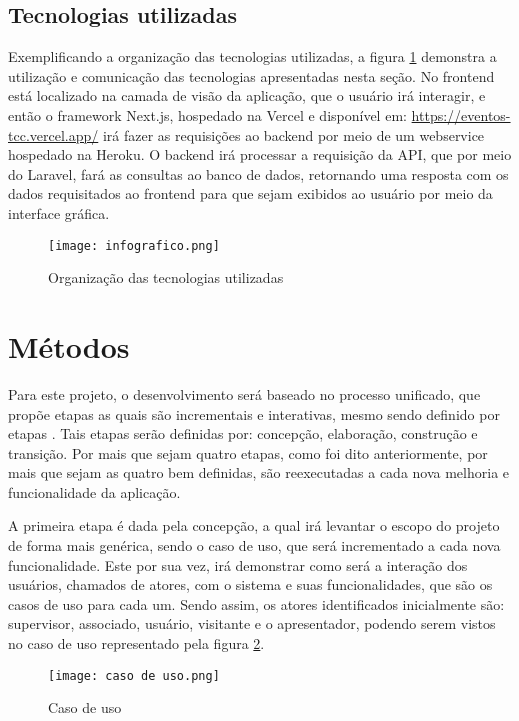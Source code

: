 \subsection{Tecnologias utilizadas}
Exemplificando a organização das tecnologias utilizadas, a figura \ref{info} demonstra a utilização e comunicação das tecnologias apresentadas nesta seção. No frontend está localizado na camada de visão da aplicação, que o usuário irá interagir, e então o framework Next.js, hospedado na Vercel e disponível em: \url{https://eventos-tcc.vercel.app/} irá fazer as requisições ao backend por meio de um webservice hospedado na Heroku. O backend irá processar a requisição da API, que por meio do Laravel, fará as consultas ao banco de dados, retornando uma resposta com os dados requisitados ao frontend para que sejam exibidos ao usuário por meio da interface gráfica.

\begin{figure}[H]
    \caption{\label{info}Organização das tecnologias utilizadas}
    \vspace{5pt}
    \centering
    \texttt{[image: infografico.png]}
    \vspace{5pt}
\end{figure}


\section{Métodos} \label{metodos}
Para este projeto, o desenvolvimento será baseado no processo unificado, que propõe etapas as quais são incrementais e interativas, mesmo sendo definido por etapas \cite{SOMMERVILE}. Tais etapas serão definidas por: concepção, elaboração, construção e transição. Por mais que sejam quatro etapas, como foi dito anteriormente, por mais que sejam as quatro bem definidas, são reexecutadas a cada nova melhoria e funcionalidade da aplicação.

A primeira etapa é dada pela concepção, a qual irá levantar o escopo do projeto de forma mais genérica, sendo o caso de uso, que será incrementado a cada nova funcionalidade. Este por sua vez, irá demonstrar como será a interação dos usuários, chamados de atores, com o sistema e suas funcionalidades, que são os casos de uso para cada um. Sendo assim, os atores identificados inicialmente são: supervisor, associado, usuário, visitante e o apresentador, podendo serem vistos no caso de uso representado pela figura \ref{fig_caso_uso}.

\begin{figure}[H]
    \caption{\label{fig_caso_uso}Caso de uso}
    \vspace{5pt}
    \centering
    \texttt{[image: caso de uso.png]}
    \vspace{5pt}
\end{figure}

